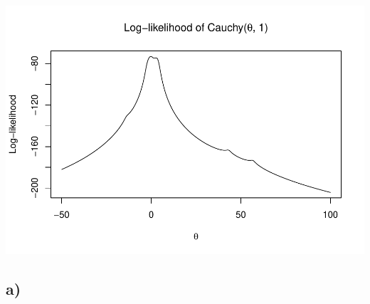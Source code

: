 \documentclass[]{article}
\begin{document}
\includegraphics{Atlas-PS_2_files/figure-latex/unnamed-chunk-7-1.pdf}

\subsection{a)}\label{a-3}
\end{document}

